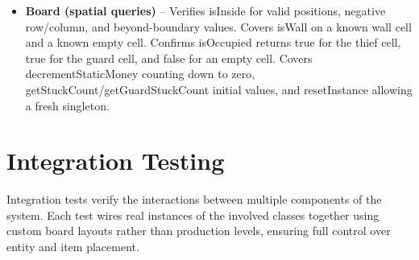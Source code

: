 \documentclass[12pt]{article}
\begin{document}
\begin{itemize}
\item \textbf{Board (spatial queries)} -- Verifies isInside for valid positions, negative row/column, and beyond-boundary values. Covers isWall on a known wall cell and a known empty cell. Confirms isOccupied returns true for the thief cell, true for the guard cell, and false for an empty cell. Covers decrementStaticMoney counting down to zero, getStuckCount/getGuardStuckCount initial values, and resetInstance allowing a fresh singleton.

\end{itemize}

\section{Integration Testing}

Integration tests verify the interactions between multiple components of the system. Each test wires real instances of the involved classes together using custom board layouts rather than production levels, ensuring full control over entity and item placement.
\end{document}
